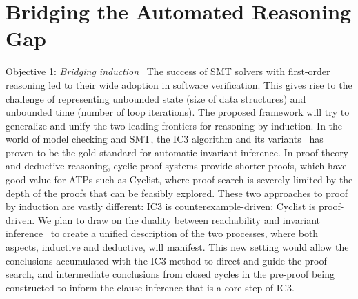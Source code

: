 \section{Bridging the Automated Reasoning Gap}


\begin{paragraph}{Objective 1: {\it Bridging induction}}~
The success of SMT solvers with first-order reasoning led to their wide adoption in software verification.
This gives rise to the challenge of representing unbounded state (\eg size of data structures) and unbounded time (\eg number of loop iterations).
The proposed framework will try to generalize and unify the two leading frontiers for reasoning by induction.
In the world of model checking and SMT, the IC3 algorithm and its variants~ has proven to be the gold standard for automatic invariant inference.
In proof theory and deductive reasoning, cyclic proof systems provide shorter proofs, which have good value for ATPs such as Cyclist, where proof search is severely limited by the depth of the proofs that can be feasibly explored.
These two approaches to proof by induction are vastly different: IC3 is counterexample-driven; Cyclist is proof-driven.
We plan to draw on the duality between reachability and invariant inference~ to create a unified description of the two processes, where both aspects, inductive and deductive, will manifest.
This new setting would allow the conclusions accumulated with the IC3 method to direct and guide the proof search, and intermediate conclusions from closed cycles in the pre-proof being constructed to inform the clause inference that is a core step of IC3.


\end{paragraph}
